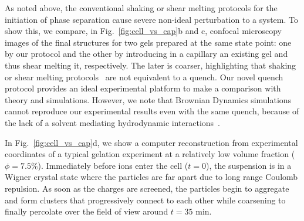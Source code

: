\documentclass[footinbib,amsmath,amssymb,superscriptaddress,twocolumn]{revtex4}
\begin{document}
As noted above, the conventional shaking or shear melting protocols for the initiation of phase separation cause severe non-ideal perturbation to a system. To show this,  
we compare, in Fig.~\ref{fig:cell_vs_cap}b and c, confocal microscopy images of the final structures for two gels prepared at the same state point: one by our protocol and the other by introducing in a capillary an existing gel and thus shear melting it, respectively. The later is coarser, highlighting that shaking or shear melting protocols~\cite{lu2008gelation,Teece2011,Bartlett2012} are not equivalent to a quench. 
Our novel quench protocol provides an ideal experimental platform to make a comparison with theory and simulations. However, we note that Brownian Dynamics simulations cannot reproduce our experimental results even with the same quench, because of the lack of a solvent mediating hydrodynamic interactions~\cite{tanaka2000simulation,Furukawa2010}. 

In Fig.~\ref{fig:cell_vs_cap}d, we show a computer reconstruction from experimental coordinates of a typical gelation experiment at a relatively low volume fraction ($\phi=7.5\%$). Immediately before ions enter the cell ($t=0$), the suspension is in a Wigner crystal state where the particles are far apart due to long range Coulomb repulsion. As soon as the charges are screened, the particles begin to aggregate and form clusters that progressively connect to each other while coarsening to finally percolate over the field of view around $t=35$ min.
\end{document}
